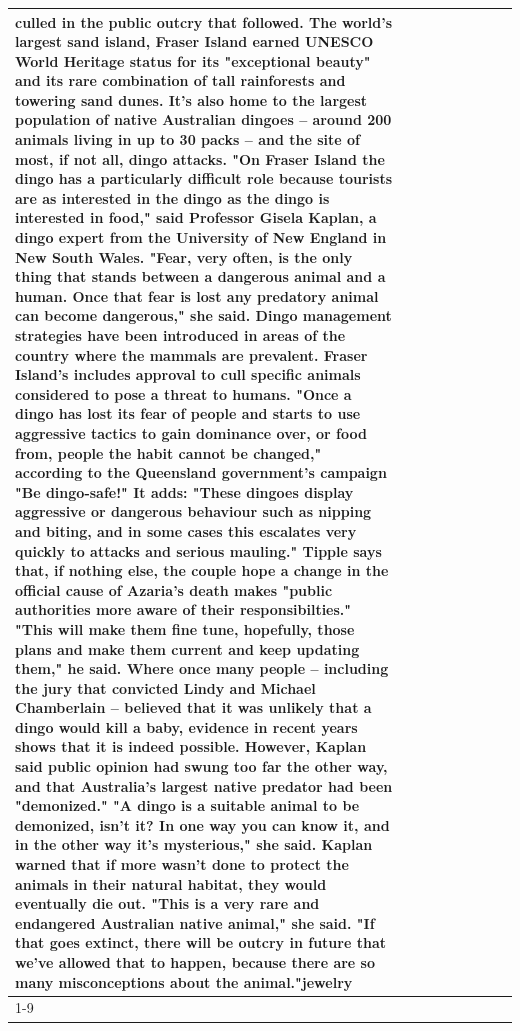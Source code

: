 \begin{table}[H]
\begin{tabular}{lllrlllll}
culled in the public outcry that followed. The world's largest sand island, Fraser Island earned UNESCO World Heritage status for its "exceptional beauty" and its rare combination of tall rainforests and towering sand dunes. It's also home to the largest population of native Australian dingoes -- around 200 animals living in up to 30 packs -- and the site of most, if not all, dingo attacks. "On Fraser Island the dingo has a particularly difficult role because tourists are as interested in the dingo as the dingo is interested in food," said Professor Gisela Kaplan, a dingo expert from the University of New England in New South Wales. "Fear, very often, is the only thing that stands between a dangerous animal and a human. Once that fear is lost any predatory animal can become dangerous," she said. Dingo management strategies have been introduced in areas of the country where the mammals are prevalent. Fraser Island's includes approval to cull specific animals considered to pose a threat to humans. "Once a dingo has lost its fear of people and starts to use aggressive tactics to gain dominance over, or food from, people the habit cannot be changed," according to the Queensland government's campaign "Be dingo-safe!" It adds: "These dingoes display aggressive or dangerous behaviour such as nipping and biting, and in some cases this escalates very quickly to attacks and serious mauling." Tipple says that, if nothing else, the couple hope a change in the official cause of Azaria's death makes "public authorities more aware of their responsibilties." "This will make them fine tune, hopefully, those plans and make them current and keep updating them," he said. Where once many people -- including the jury that convicted Lindy and Michael Chamberlain -- believed that it was unlikely that a dingo would kill a baby, evidence in recent years shows that it is indeed possible. However, Kaplan said public opinion had swung too far the other way, and that Australia's largest native predator had been "demonized." "A dingo is a suitable animal to be demonized, isn't it? In one way you can know it, and in the other way it's mysterious," she said. Kaplan warned that if more wasn't done to protect the animals in their natural habitat, they would eventually die out. "This is a very rare and endangered Australian native animal," she said. "If that goes extinct, there will be outcry in future that we've allowed that to happen, because there are so many misconceptions about the animal."jewelry \\
\cline{1-9}

\end{tabular}
\end{table}
